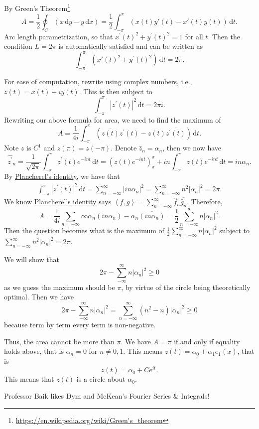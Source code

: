 \begin{explanation}
	By Green's Theorem\footnote{\url{https://en.wikipedia.org/wiki/Green's_theorem}}
	\[
		A = \frac{1}{2} \oint_C (x \,\mathrm{d}y - y \,\mathrm{d}x) = \frac{1}{2} \int_{-\pi}^\pi (x(t)y'(t) - x'(t)y(t)) \,\mathrm{d}t.
	\]
	Arc length parametrization, so that \(x^\prime (t)^2 + y^\prime (t)^2 = 1\) for all \(t\). Then the
	condition \(L = 2 \pi\) is automatically satisfied and can be written as
	\[
		\int_{-\pi}^\pi (x'(t)^2 + y^\prime(t)^2) \,\mathrm{d}t = 2\pi.
	\]

	For ease of computation, rewrite using complex numbers, i.e., \(z(t) = x(t) + i y(t)\). This is then subject to
	\[
		\int_{-\pi}^\pi \left\vert z^\prime(t) \right\vert^2 \,\mathrm{d}t = 2 \pi i.
	\]
	Rewriting our above formula for area, we need to find the maximum of
	\[
		A = \frac{1}{4i}\int_{-\pi}^\pi (\overline{z(t)}z^\prime(t) - z(t)\overline{z^\prime(t)}) \,\mathrm{d}t.
	\]
	Note \(z\) is \(C^1\) and \(z(\pi) = z(-\pi)\). Denote \(\hat{z}_n = \alpha_n\), then we now have
	\[
		\widehat{z^\prime}_n
		= \frac{1}{\sqrt{2\pi} } \int_{-\pi}^\pi z^\prime(t) e^{-in t} \,\mathrm{d}t
		= \left(z(t)e^{-i n t}\right)^\pi_\pi + in\int_{-\pi}^\pi z(t) e^{-in t} \,\mathrm{d}t
		= in\alpha_n.
	\]
	By \hyperref[eg:Plancherel-identity]{Plancherel's identity}, we have that
	\begin{align*}
		\int_{-\pi}^\pi \left\vert z^\prime (t) \right\vert ^2 \,\mathrm{d}t
		= \sum_{n=-\infty}^\infty \left\vert in\alpha_n \right\vert ^2
		= \sum_{n=-\infty}^\infty n^2 \left\vert \alpha_n \right\vert ^2 = 2\pi.
	\end{align*}
	We know \hyperref[eg:Plancherel-identity]{Plancherel's identity} says \(\left< f,g \right> = \sum_{n=-\infty}^\infty \hat{f}_n\overline{\hat{g}_n}\).
	Therefore,
	\[
		A = \frac{1}{4i} \sum_{n=-\infty}\infty \overline{\alpha_n}(in\alpha_n) - \alpha_n\overline{(in\alpha_n)}
		= \frac{1}{2} \sum_{n=-\infty}^\infty n \left\vert \alpha_n \right\vert ^2.
	\]
	Then the question becomes what is the maximum of \(\frac{1}{2}\sum_{n=-\infty}^\infty n\left\vert \alpha_n \right\vert^2\)
	subject to \(\sum_{n=-\infty}^\infty n^2\left\vert \alpha_n \right\vert^2 = 2\pi\).

	We will show that
	\[
		2 \pi - \sum_{-\infty}^\infty n\left\vert \alpha_n \right\vert^2 \geq 0
	\]
	as we guess the maximum should be \(\pi\), by virtue of the circle being theoretically optimal. Then we have
	\[
		2 \pi - \sum_{-\infty}^\infty n\left\vert \alpha_n \right\vert^2 = \sum_{n=-\infty}^\infty (n^2-n)\left\vert \alpha_n \right\vert^2 \geq 0
	\]
	because term by term every term is non-negative.

	Thus, the area cannot be more than \(\pi\). We have \(A = \pi\) if and only if equality holds above, that is
	\(\alpha_n = 0\) for \(n \neq 0,1\). This means \(z(t) = \alpha_0 + \alpha_1 e_1(x)\), that is
	\[
		z(t) = \alpha_0 + Ce^{it}.
	\]
	This means that \(z(t)\) is a circle about \(\alpha_0\).
\end{explanation}

\begin{note}
	Professor Baik likes Dym and McKean's Fourier Series \& Integrals\cite{dym1972fourier}!
\end{note}
